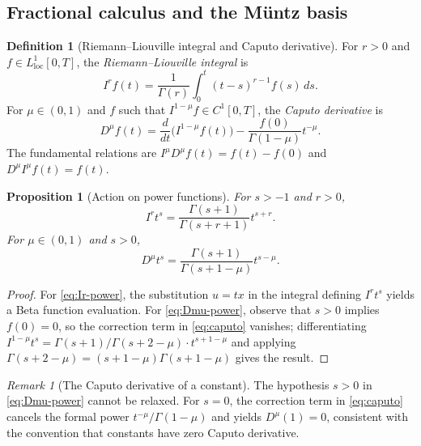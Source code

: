 \documentclass[11pt]{article}
\newtheorem{proposition}[theorem]{Proposition}
\theoremstyle{definition}
\newtheorem{definition}[theorem]{Definition}
\theoremstyle{remark}
\newtheorem{remark}[theorem]{Remark}
\begin{document}
\subsection{Fractional calculus and the M\"untz basis}
\label{sec:heston-prelim}

\begin{definition}[Riemann--Liouville integral and Caputo derivative]
\label{def:RL-Caputo}
For $r>0$ and $f\in L^{1}_{\mathrm{loc}}[0,T]$, the \emph{Riemann--Liouville integral} is
\begin{equation}
I^{r}f(t)=\frac{1}{\Gamma(r)}\int_{0}^{t}(t-s)^{r-1}f(s)\,ds.
\label{eq:RL-integral}
\end{equation}
For $\mu\in(0,1)$ and $f$ such that $I^{1-\mu}f\in C^{1}[0,T]$, the \emph{Caputo derivative} is
\begin{equation}
D^{\mu}f(t)=\frac{d}{dt}\bigl(I^{1-\mu}f(t)\bigr)-\frac{f(0)}{\Gamma(1-\mu)}t^{-\mu}.
\label{eq:caputo}
\end{equation}
The fundamental relations are $I^{\mu}D^{\mu}f(t)=f(t)-f(0)$ and $D^{\mu}I^{\mu}f(t)=f(t)$.
\end{definition}

\begin{proposition}[Action on power functions]
\label{prop:powers}
For $s>-1$ and $r>0$,
\begin{equation}
I^{r}t^{s}=\frac{\Gamma(s+1)}{\Gamma(s+r+1)}t^{s+r}.
\label{eq:Ir-power}
\end{equation}
For $\mu\in(0,1)$ and $s>0$,
\begin{equation}
D^{\mu}t^{s}=\frac{\Gamma(s+1)}{\Gamma(s+1-\mu)}t^{s-\mu}.
\label{eq:Dmu-power}
\end{equation}
\end{proposition}

\begin{proof}
For \eqref{eq:Ir-power}, the substitution $u=tx$ in the integral defining $I^{r}t^{s}$ yields a Beta function evaluation. For \eqref{eq:Dmu-power}, observe that $s>0$ implies $f(0)=0$, so the correction term in \eqref{eq:caputo} vanishes; differentiating $I^{1-\mu}t^{s}=\Gamma(s+1)/\Gamma(s+2-\mu)\cdot t^{s+1-\mu}$ and applying $\Gamma(s+2-\mu)=(s+1-\mu)\Gamma(s+1-\mu)$ gives the result.
\end{proof}

\begin{remark}[The Caputo derivative of a constant]
\label{rem:Dmu-const}
The hypothesis $s>0$ in \eqref{eq:Dmu-power} cannot be relaxed. For $s=0$, the correction term in \eqref{eq:caputo} cancels the formal power $t^{-\mu}/\Gamma(1-\mu)$ and yields $D^{\mu}(1)=0$, consistent with the convention that constants have zero Caputo derivative.
\end{remark}
\end{document}
